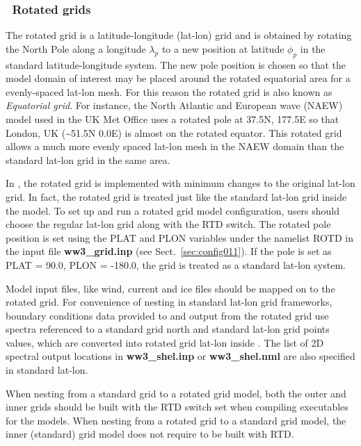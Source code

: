\vssub
\subsubsection{~Rotated grids} \label{sub:num_space_rotagrid}

\noindent
The rotated grid is a latitude-longitude (lat-lon) grid and is obtained by
rotating the North Pole along a longitude $\lambda_{p}$ to a new position at
latitude $\phi_{p}$ in the standard latitude-longitude system.  The new
pole position is chosen so that the model domain of interest may be placed
around the rotated equatorial area for a evenly-spaced lat-lon mesh. For this
reason the rotated grid is also known as \emph{Equatorial grid}. For instance,
the North Atlantic and European wave (NAEW) model used in the UK Met Office
uses a rotated pole at 37.5N, 177.5E so that London, UK
(\textasciitilde{}51.5N 0.0E) is almost on the rotated equator. This rotated
grid allows a much more evenly spaced lat-lon mesh in the NAEW domain than the
standard lat-lon grid in the same area. 

In \ws, the rotated grid is implemented with minimum changes to the original
lat-lon grid. In fact, the rotated grid is treated just like the standard 
lat-lon grid inside the model. To set up and run a rotated grid model configuration,
users should choose the regular lat-lon grid along with the {\code RTD} switch.
The rotated pole position is set using the {\code PLAT} and {\code PLON} variables
under the namelist {\code ROTD} in the input file {\bf ww3\_grid.inp}
(see Sect.~\ref{sec:config011}). If the pole is set as {\code PLAT = 90.0},
{\code PLON = -180.0}, the grid is treated as a standard lat-lon system.

Model input files, like wind, current and ice files
should be mapped on to the rotated grid. For convenience of nesting in standard
lat-lon grid frameworks, boundary conditions data provided to and output from the
rotated grid use spectra referenced to a standard grid north and standard lat-lon
grid points values, which are converted into rotated grid lat-lon inside \ws.
The list of 2D spectral output locations in {\bf ww3\_shel.inp} or
{\bf ww3\_shel.nml} are also specified in standard lat-lon.

When nesting from a standard grid to a rotated grid model, both the outer and inner
grids should be built with the {\code RTD} switch set when compiling executables for
the models. When nesting from a rotated grid to a standard grid model, the inner
(standard) grid model does not require to be built with {\code RTD}.

